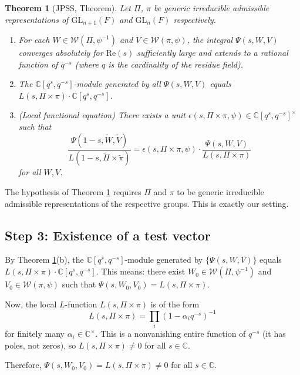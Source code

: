 \documentclass[12pt]{article}
\newtheorem{theorem}{Theorem}
\begin{document}
\begin{theorem}[JPSS, Theorem]\label{thm:JPSS}
Let $\Pi$, $\pi$ be generic irreducible admissible representations of $\mathrm{GL}_{n+1}(F)$ and $\mathrm{GL}_n(F)$ respectively.
\begin{enumerate}
\item[(a)] For each $W \in \mathcal{W}(\Pi, \psi^{-1})$ and $V \in \mathcal{W}(\pi, \psi)$, the integral $\Psi(s, W, V)$ converges absolutely for $\mathrm{Re}(s)$ sufficiently large and extends to a rational function of $q^{-s}$ (where $q$ is the cardinality of the residue field).
\item[(b)] The $\mathbb{C}[q^s, q^{-s}]$-module generated by all $\Psi(s, W, V)$ equals $L(s, \Pi \times \pi) \cdot \mathbb{C}[q^s, q^{-s}]$.
\item[(c)] (Local functional equation) There exists a unit $\epsilon(s, \Pi \times \pi, \psi) \in \mathbb{C}[q^s, q^{-s}]^\times$ such that
\[
\frac{\Psi(1-s, \tilde{W}, \tilde{V})}{L(1-s, \tilde{\Pi} \times \tilde{\pi})} = \epsilon(s, \Pi \times \pi, \psi) \cdot \frac{\Psi(s, W, V)}{L(s, \Pi \times \pi)}
\]
for all $W, V$.
\end{enumerate}
\end{theorem}

The hypothesis of Theorem \ref{thm:JPSS} requires $\Pi$ and $\pi$ to be generic irreducible admissible representations of the respective groups. This is exactly our setting.

\subsection{Step 3: Existence of a test vector}

By Theorem \ref{thm:JPSS}(b), the $\mathbb{C}[q^s, q^{-s}]$-module generated by $\{\Psi(s, W, V)\}$ equals $L(s, \Pi \times \pi) \cdot \mathbb{C}[q^s, q^{-s}]$. This means: there exist $W_0 \in \mathcal{W}(\Pi, \psi^{-1})$ and $V_0 \in \mathcal{W}(\pi, \psi)$ such that $\Psi(s, W_0, V_0) = L(s, \Pi \times \pi)$.

Now, the local $L$-function $L(s, \Pi \times \pi)$ is of the form
\[
L(s, \Pi \times \pi) = \prod_{i} (1 - \alpha_i q^{-s})^{-1}
\]
for finitely many $\alpha_i \in \mathbb{C}^\times$. This is a nonvanishing entire function of $q^{-s}$ (it has poles, not zeros), so $L(s, \Pi \times \pi) \neq 0$ for all $s \in \mathbb{C}$.

Therefore, $\Psi(s, W_0, V_0) = L(s, \Pi \times \pi) \neq 0$ for all $s \in \mathbb{C}$.
\end{document}
